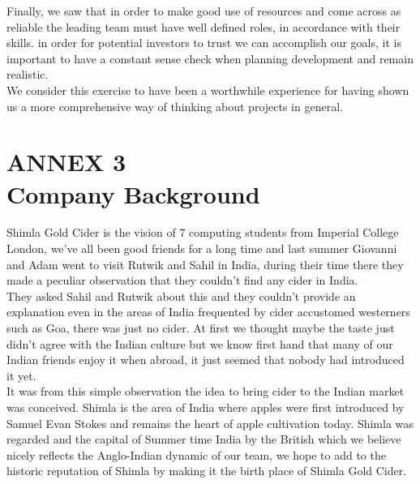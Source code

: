\documentclass[11pt]{article}
\begin{document}
\noindent Finally, we saw that in order to make good use of resources and come across as reliable the leading team must have well defined roles, in accordance with their skills. in order for potential investors to trust we can accomplish our goals, it is important to have a constant sense check when planning development and remain realistic.\\

\noindent We consider this exercise to have been a worthwhile experience for having shown us a more comprehensive way of thinking about projects in general.

\newpage

\section{ANNEX 3 \\ Company Background}
Shimla Gold Cider is the vision of 7 computing students from Imperial College London, we've all been good friends for a long time and last summer Giovanni and Adam went to visit Rutwik and Sahil in India, during their time there they made a peculiar observation that they couldn't find any cider in India. \\

\noindent They asked Sahil and Rutwik about this and they couldn't provide an explanation even in the areas of India frequented by cider accustomed westerners such as Goa, there was just no cider. At first we thought maybe the taste just didn't agree with the Indian culture but we know first hand that many of our Indian friends enjoy it when abroad, it just seemed that nobody had introduced it yet. \\

\noindent It was from this simple observation the idea to bring cider to the Indian market was conceived. Shimla is the area of India where apples were first introduced by Samuel Evan Stokes and remains the heart of apple cultivation today. Shimla was regarded and the capital of Summer time India by the British which we believe nicely reflects the Anglo-Indian dynamic of our team, we hope to add to the historic reputation of Shimla by making it the birth place of Shimla Gold Cider.

\newpage
\end{document}
